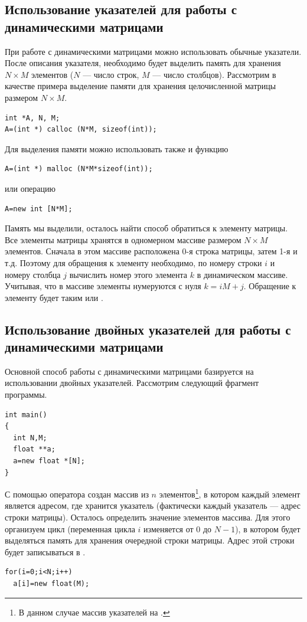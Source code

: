 \subsection[Использование указателей для работы с динамическими матрицами]{Использование указателей для работы с
динамическими матрицами}
При работе с динамическими матрицами можно использовать обычные указатели. После описания указателя, необходимо будет
выделить память для хранения $N\times M$ элементов ($N$ --- число строк, $M$ --- число столбцов). Рассмотрим
в качестве примера выделение памяти для хранения целочисленной матрицы размером $N\times M$.
\begin{lstlisting}
int *A, N, M;
A=(int *) calloc (N*M, sizeof(int));
\end{lstlisting}
Для выделения памяти можно использовать также и функцию  
\begin{lstlisting}
A=(int *) malloc (N*M*sizeof(int));
\end{lstlisting}
или операцию 
\begin{lstlisting}
A=new int [N*M];
\end{lstlisting}

Память мы выделили, осталось найти способ обратиться к элементу матрицы. Все элементы матрицы хранятся в одномерном
массиве размером $N\times M$ элементов. Сначала в этом массиве расположена 0-я строка матрицы, затем 1-я и т.д.
Поэтому для обращения к элементу  необходимо, по номеру строки $i$ и номеру столбца $j$ вычислить номер этого
элемента $k$ в динамическом массиве. Учитывая, что в массиве элементы нумеруются с нуля
$k=iM+j$. Обращение к элементу 
будет таким  или .

\subsection[Использование двойных указателей для работы с динамическими матрицами]{Использование двойных указателей
для работы с динамическими матрицами}
Основной способ работы с динамическими матрицами базируется на использовании двойных указателей. Рассмотрим следующий
фрагмент программы.
\begin{lstlisting}
int main()
{
  int N,M; 
  float **a;
  a=new float *[N];
}
\end{lstlisting}

С помощью оператора  создан массив из $n$ элементов\footnote{В данном случае массив указателей 
на .}, в котором
каждый элемент является адресом, где хранится указатель (фактически каждый указатель --- адрес строки матрицы). Осталось
определить значение элементов массива. Для этого организуем цикл (переменная цикла $i$ изменяется от 0 до
$N-1$), в котором будет выделяться память для хранения очередной строки матрицы. Адрес этой строки будет
записываться в .
\begin{lstlisting}
for(i=0;i<N;i++)
  a[i]=new float(M);
\end{lstlisting}

